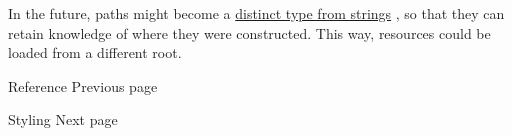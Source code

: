 In the future, paths might become a
\href{https://github.com/typst/typst/issues/971}{distinct type from
strings} , so that they can retain knowledge of where they were
constructed. This way, resources could be loaded from a different root.

\href{/docs/reference/}{\pandocbounded{}}

{ Reference } { Previous page }

\href{/docs/reference/styling/}{\pandocbounded{}}

{ Styling } { Next page }
